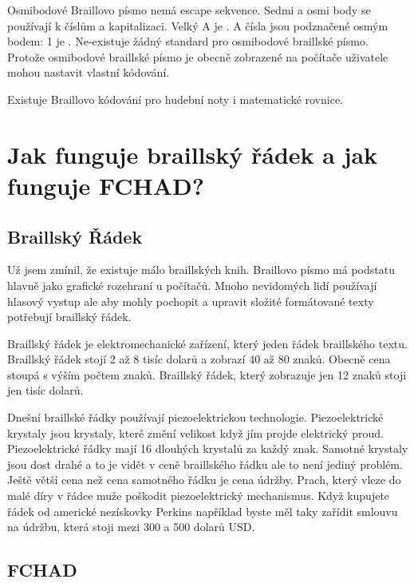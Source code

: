 Osmibodové Braillovo písmo nemá escape sekvence.  Sedmi a osmi body se používají k číslům a kapitalizaci. Velký A je
. A čísla jsou podznačené osmým bodem: 1 je
. Ne-existuje žádný standard pro osmibodové braillské písmo\citep{6dotbraille}.  Protože osmibodové braillské písmo je obecně zobrazené na počítače uživatele mohou nastavit vlastní kódování.

Existuje Braillovo kódování pro hudební noty i matematické rovnice.

\section{Jak funguje braillský řádek a jak funguje FCHAD?}

\subsection{Braillský Řádek}

Už jsem zmínil, že existuje málo braillských knih. Braillovo písmo má podstatu hlavně jako grafické rozehraní u počítačů.  Mnoho nevidomých lidí používají hlasový vystup ale aby mohly pochopit a upravit složité formátované texty potřebují braillský řádek.

Braillský řádek je elektromechanické zařízení, který  jeden řádek braillského textu.  Braillský řádek stojí 2 až 8 tisíc dolarů a zobrazí 40 až 80 znaků.  Obecně cena stoupá s výším počtem znaků.  Braillský řádek, který zobrazuje jen 12 znaků stoji jen tisíc dolarů\citep{perkinsdisplays}.

Dnešní braillské řádky používají piezoelektrickou technologie.  Piezoelektrické krystaly jsou krystaly, které změní velikost když jím projde elektrický proud. Piezoelektrické řádky mají 16 dlouhých krystalů za každý znak.  Samotné krystaly jsou dost drahé a to je vidět v ceně braillského řádku ale to není jediný problém.  Ještě větší cena než cena samotného řádku je cena údržby.  Prach, který vleze do malé díry v řádce muže poškodit piezoelektrický mechanismus.  Když kupujete řádek od americké nezískovky Perkins například byste měl taky zařídit smlouvu na údržbu, která stoji mezi 300 a 500 dolarů USD\citep{perkinsdisplays}.

\subsection{FCHAD}

